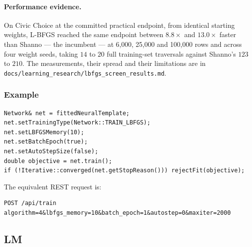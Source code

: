 \paragraph{Performance evidence.}  On Civic Choice at the committed practical
endpoint, from identical starting weights, L-BFGS reached the same endpoint
between $8.8\times$ and $13.0\times$ faster than Shanno --- the incumbent --- at
6,000, 25,000 and 100,000 rows and across four weight seeds, taking $14$ to $20$
full training-set traversals against Shanno's $123$ to $210$.  The measurements,
their spread and their limitations are in
\texttt{docs/learning\_research/lbfgs\_screen\_results.md}.

\subsubsection{Example}
\begin{verbatim}
Network& net = fittedNeuralTemplate;
net.setTrainingType(Network::TRAIN_LBFGS);
net.setLBFGSMemory(10);
net.setBatchEpoch(true);
net.setAutoStepSize(false);
double objective = net.train();
if (!Iterative::converged(net.getStopReason())) rejectFit(objective);
\end{verbatim}

The equivalent REST request is:
\begin{verbatim}
POST /api/train
algorithm=4&lbfgs_memory=10&batch_epoch=1&autostep=0&maxiter=2000
\end{verbatim}

\subsection{LM}

